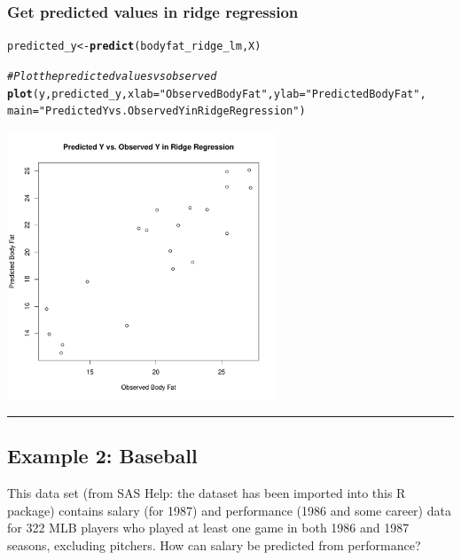 \documentclass{article}\usepackage[]{graphicx}\usepackage[]{color}
\makeatletter
\newcommand{\hlstr}[1]{\textcolor[rgb]{0.192,0.494,0.8}{#1}}%
\newcommand{\hlcom}[1]{\textcolor[rgb]{0.678,0.584,0.686}{\textit{#1}}}%
\newcommand{\hlstd}[1]{\textcolor[rgb]{0.345,0.345,0.345}{#1}}%
\newcommand{\hlkwb}[1]{\textcolor[rgb]{0.69,0.353,0.396}{#1}}%
\newcommand{\hlkwc}[1]{\textcolor[rgb]{0.333,0.667,0.333}{#1}}%
\newcommand{\hlkwd}[1]{\textcolor[rgb]{0.737,0.353,0.396}{\textbf{#1}}}%
\newenvironment{kframe}{%
 \def\at@end@of@kframe{}%
 \ifinner\ifhmode%
  \def\at@end@of@kframe{\end{minipage}}%
  \begin{minipage}{\columnwidth}%
 \fi\fi%
 \def\FrameCommand##1{\hskip\@totalleftmargin \hskip-\fboxsep
 \colorbox{shadecolor}{##1}\hskip-\fboxsep
     \hskip-\linewidth \hskip-\@totalleftmargin \hskip\columnwidth}%
 \MakeFramed {\advance\hsize-\width
   \@totalleftmargin\z@ \linewidth\hsize
   \@setminipage}}%
 {\par\unskip\endMakeFramed%
 \at@end@of@kframe}
\newenvironment{knitrout}{}{} %
\makeatother
\begin{document}
\subsubsection*{Get predicted values in ridge regression}

\begin{knitrout}
\color{fgcolor}\begin{kframe}
\begin{alltt}
\hlstd{predicted_y} \hlkwb{<-} \hlkwd{predict}\hlstd{(bodyfat_ridge_lm, X)}

\hlcom{# Plot the predicted values vs observed}
\hlkwd{plot}\hlstd{(y, predicted_y,} \hlkwc{xlab} \hlstd{=} \hlstr{"Observed Body Fat"}\hlstd{,} \hlkwc{ylab} \hlstd{=} \hlstr{"Predicted Body Fat"}\hlstd{,}
     \hlkwc{main} \hlstd{=} \hlstr{"Predicted Y vs. Observed Y in Ridge Regression"}\hlstd{)}
\end{alltt}
\end{kframe}

{\centering \includegraphics[width=0.6\textwidth]{figure/unnamed-chunk-6-1} 

}



\end{knitrout}

\medskip
\hrule
\medskip

\subsection*{Example 2: Baseball}

This data set (from SAS Help: the dataset has been imported into this R package) contains salary (for 1987) and performance (1986 and some career) data for 322 MLB players who played at least one game in both 1986 and 1987 seasons, excluding pitchers. How can salary be predicted from performance?
\end{document}
